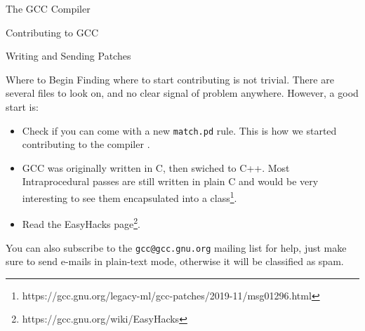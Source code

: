 \begin{section}{The GCC Compiler}
\begin{section}{Contributing to GCC}
\begin{subsection}{Writing and Sending Patches}
\end{subsection}

\begin{subsection}{Where to Begin}
	Finding where to start contributing is not trivial. There are several
	files to look on, and no clear signal of problem anywhere. However,
	a good start is:
	\begin{itemize}
		\item Check if you can come with a new \texttt{match.pd} rule. This
		is how we started contributing to the compiler \citep{sinatan_flusp}.

		\item GCC was originally written in C, then swiched to C++. Most
		Intraprocedural passes are still written in plain C and would be
		very interesting to see them encapsulated into a class\footnote{https://gcc.gnu.org/legacy-ml/gcc-patches/2019-11/msg01296.html}.

		\item Read the EasyHacks page\footnote{https://gcc.gnu.org/wiki/EasyHacks}.
	\end{itemize}

	You can also subscribe to the \texttt{gcc@gcc.gnu.org} mailing list for help,
	just make sure to send e-mails in plain-text mode, otherwise it will be
	classified as spam.

\end{subsection}

\end{section}

\end{section}

